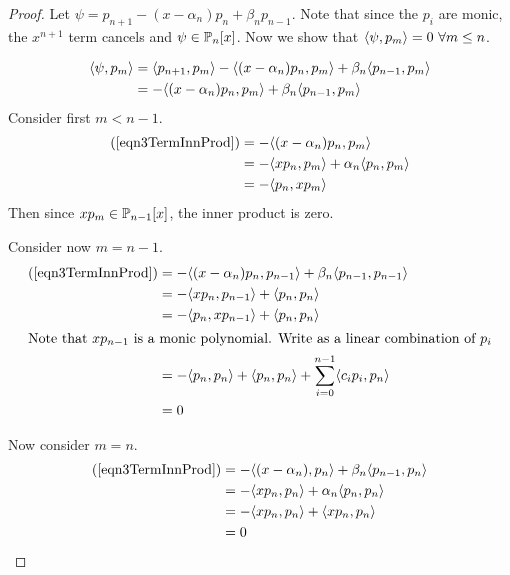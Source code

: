 \documentclass[../Main.tex]{subfiles}
\begin{document}
\begin{proof}
    Let $\psi = p_{n+1} - (x - \alpha_n) p_n + \beta_n p_{n-1}$. Note that since the $p_i$ are monic, the $x^{n+1}$ term cancels and $\psi \in \P_n[x]$. Now we show that $\inn{\psi}{p_m} = 0~\forall m \leq n$.

    \begin{align}
        \inn{\psi}{p_m} &= \inn{p_{n+1}}{p_m} - \inn{(x - \alpha_n) p_n}{p_m} + \beta_n \inn{p_{n-1}}{p_m} \nonumber \\
        &= -\inn{(x - \alpha_n) p_n}{p_m} + \beta_n \inn{p_{n-1}}{p_m} \label{eqn3TermInnProd}
    \end{align}
    Consider first $m < n-1$.
    \begin{align*}
        (\ref{eqn3TermInnProd}) &= -\inn{(x - \alpha_n)p_n}{p_m} \\
        &= -\inn{xp_n}{p_m} + \alpha_n \inn{p_n}{p_m} \\
        &= -\inn{p_n}{xp_m}
    \end{align*}
    Then since $xp_m \in \P_{n-1}[x]$, the inner product is zero.

    Consider now $m = n-1$.
    \begin{align*}
        (\ref{eqn3TermInnProd}) &= -\inn{(x - \alpha_n)p_n}{p_{n-1}} + \beta_n \inn{p_{n-1}}{p_{n-1}} \\
        &= -\inn{x p_n}{p_{n-1}} + \inn{p_n}{p_n} \\
        &= -\inn{p_n}{x p_{n-1}} + \inn{p_n}{p_n} \\
        \intertext{Note that $x p_{n-1}$ is a monic polynomial. Write as a linear combination of $p_i$}
        &= -\inn{p_n}{p_n} + \inn{p_n}{p_n} + \sum_{i=0}^{n-1} \inn{c_i p_i}{p_n} \\
        &= 0
    \end{align*}

    Now consider $m = n$.
    \begin{align*}
        (\ref{eqn3TermInnProd}) &= -\inn{(x - \alpha_n)}{p_n} + \beta_n \inn{p_{n-1}}{p_n} \\
        &= -\inn{xp_n}{p_n} + \alpha_n \inn{p_n}{p_n} \\
        &= -\inn{xp_n}{p_n} + \inn{x p_n}{p_n} \\
        &= 0
    \end{align*}
\end{proof}
\end{document}

